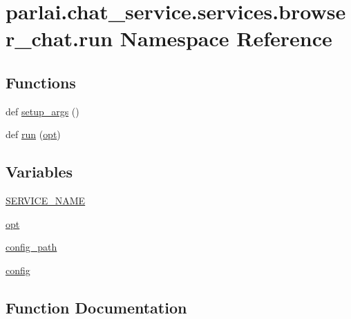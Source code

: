 \hypertarget{namespaceparlai_1_1chat__service_1_1services_1_1browser__chat_1_1run}{}\section{parlai.\+chat\+\_\+service.\+services.\+browser\+\_\+chat.\+run Namespace Reference}
\label{namespaceparlai_1_1chat__service_1_1services_1_1browser__chat_1_1run}
\subsection*{Functions}
\begin{DoxyCompactItemize}
\item 
def \hyperlink{namespaceparlai_1_1chat__service_1_1services_1_1browser__chat_1_1run_a4c6727a6d621a62295a39de7ecb804f7}{setup\+\_\+args} ()
\item 
def \hyperlink{namespaceparlai_1_1chat__service_1_1services_1_1browser__chat_1_1run_ac2e6b9d5c874de55da8f5c16f59fe7e6}{run} (\hyperlink{namespaceparlai_1_1chat__service_1_1services_1_1browser__chat_1_1run_ac4c9f1982c7e4ce152192d0f7bf5bf7d}{opt})
\end{DoxyCompactItemize}
\subsection*{Variables}
\begin{DoxyCompactItemize}
\item 
\hyperlink{namespaceparlai_1_1chat__service_1_1services_1_1browser__chat_1_1run_a1df6780997790387ac4f30996edd0f66}{S\+E\+R\+V\+I\+C\+E\+\_\+\+N\+A\+ME}
\item 
\hyperlink{namespaceparlai_1_1chat__service_1_1services_1_1browser__chat_1_1run_ac4c9f1982c7e4ce152192d0f7bf5bf7d}{opt}
\item 
\hyperlink{namespaceparlai_1_1chat__service_1_1services_1_1browser__chat_1_1run_a59347589836f32bb41705f1eb7b54e62}{config\+\_\+path}
\item 
\hyperlink{namespaceparlai_1_1chat__service_1_1services_1_1browser__chat_1_1run_aeb1c1b0dde4fbc5d8a57e4224e68c616}{config}
\end{DoxyCompactItemize}


\subsection{Function Documentation}
\mbox{\label{namespaceparlai_1_1chat__service_1_1services_1_1browser__chat_1_1run_ac2e6b9d5c874de55da8f5c16f59fe7e6}} 
